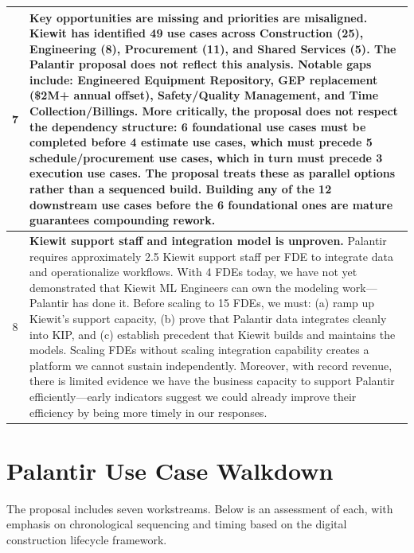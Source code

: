 \documentclass[11pt, letterpaper]{article}
\begin{document}
{\begin{tabular}{@{}c p{}@{}}
\midrule
7 & \textbf{Key opportunities are missing and priorities are misaligned.} Kiewit has identified 49 use cases across Construction (25), Engineering (8), Procurement (11), and Shared Services (5). The Palantir proposal does not reflect this analysis. Notable gaps include: Engineered Equipment Repository, GEP replacement (\$2M+ annual offset), Safety/Quality Management, and Time Collection/Billings. More critically, the proposal does not respect the dependency structure: \textbf{6 foundational use cases} must be completed before \textbf{4 estimate use cases}, which must precede \textbf{5 schedule/procurement use cases}, which in turn must precede \textbf{3 execution use cases}. The proposal treats these as parallel options rather than a sequenced build. Building any of the 12 downstream use cases before the 6 foundational ones are mature guarantees compounding rework. \\
\midrule
8 & \textbf{Kiewit support staff and integration model is unproven.} Palantir requires approximately 2.5 Kiewit support staff per FDE to integrate data and operationalize workflows. With 4 FDEs today, we have not yet demonstrated that Kiewit ML Engineers can own the modeling work---Palantir has done it. Before scaling to 15 FDEs, we must: (a) ramp up Kiewit's support capacity, (b) prove that Palantir data integrates cleanly into KIP, and (c) establish precedent that Kiewit builds and maintains the models. Scaling FDEs without scaling integration capability creates a platform we cannot sustain independently. Moreover, with record revenue, there is limited evidence we have the business capacity to support Palantir efficiently---early indicators suggest we could already improve their efficiency by being more timely in our responses. \\
\bottomrule
\end{tabular}
}
\renewcommand{\arraystretch}{1.0}

\vspace{1em}

\section*{Palantir Use Case Walkdown}

The proposal includes seven workstreams. Below is an assessment of each, with emphasis on chronological sequencing and timing based on the digital construction lifecycle framework.

\vspace{0.5em}
\end{document}
